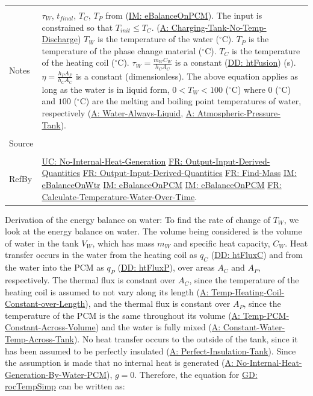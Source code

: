 \documentclass[12pt]{article}
\begin{document}
\begin{minipage}{\textwidth}
\begin{tabular}{p{} p{}}
\\ \midrule \\
Notes & ${τ_{W}}$, ${t_{final}}$, ${T_{C}}$, ${T_{P}}$ from (\hyperref[IM:eBalanceOnPCM]{IM: eBalanceOnPCM}). The input is constrained so that ${T_{init}}\leq{}{T_{C}}$. (\hyperref[assumpCTNOD]{A: Charging-Tank-No-Temp-Discharge}) ${T_{W}}$ is the temperature of the water (${}^{\circ}$C). ${T_{P}}$ is the temperature of the phase change material (${}^{\circ}$C). ${T_{C}}$ is the temperature of the heating coil (${}^{\circ}$C). ${τ_{W}}=\frac{{m_{W}} {C_{W}}}{{h_{C}} {A_{C}}}$ is a constant (\hyperref[DD:htFusion]{DD: htFusion}) (s). $η=\frac{{h_{P}} {A_{P}}}{{h_{C}} {A_{C}}}$ is a constant (dimensionless). The above equation applies as long as the water is in liquid form, $0<{T_{W}}<100$ (${}^{\circ}$C) where $0$ (${}^{\circ}$C) and $100$ (${}^{\circ}$C) are the melting and boiling point temperatures of water, respectively (\hyperref[assumpWAL]{A: Water-Always-Liquid}, \hyperref[assumpAPT]{A: Atmospheric-Pressure-Tank}).
\\ \midrule \\
Source & \cite{koothoor2013}
\\ \midrule \\
RefBy & \hyperref[unlikeChgNIHG]{UC: No-Internal-Heat-Generation} \hyperref[outputInputDerivQuants]{FR: Output-Input-Derived-Quantities} \hyperref[outputInputDerivQuants]{FR: Output-Input-Derived-Quantities} \hyperref[findMass]{FR: Find-Mass} \hyperref[IM:eBalanceOnWtr]{IM: eBalanceOnWtr} \hyperref[IM:eBalanceOnPCM]{IM: eBalanceOnPCM} \hyperref[IM:eBalanceOnPCM]{IM: eBalanceOnPCM} \hyperref[calcTempWtrOverTime]{FR: Calculate-Temperature-Water-Over-Time}.
\\ \bottomrule \end{tabular}
\end{minipage}
Derivation of the energy balance on water:
To find the rate of change of ${T_{W}}$, we look at the energy balance on water. The volume being considered is the volume of water in the tank ${V_{W}}$, which has mass ${m_{W}}$ and specific heat capacity, ${C_{W}}$. Heat transfer occurs in the water from the heating coil as ${q_{C}}$ (\hyperref[DD:htFluxC]{DD: htFluxC})  and from the water into the PCM as ${q_{P}}$ (\hyperref[DD:htFluxP]{DD: htFluxP}), over areas ${A_{C}}$ and ${A_{P}}$, respectively. The thermal flux is constant over ${A_{C}}$, since the temperature of the heating coil is assumed to not vary along its length (\hyperref[assumpTHCCoL]{A: Temp-Heating-Coil-Constant-over-Length}), and the thermal flux is constant over ${A_{P}}$, since the temperature of the PCM is the same throughout its volume (\hyperref[assumpTPCAV]{A: Temp-PCM-Constant-Across-Volume}) and the water is fully mixed (\hyperref[assumpCWTAT]{A: Constant-Water-Temp-Across-Tank}). No heat transfer occurs to the outside of the tank, since it has been assumed to be perfectly insulated (\hyperref[assumpPIT]{A: Perfect-Insulation-Tank}). Since the assumption is made that no internal heat is generated (\hyperref[assumpNIHGBWP]{A: No-Internal-Heat-Generation-By-Water-PCM}), $g=0$. Therefore, the equation for \hyperref[GD:rocTempSimp]{GD: rocTempSimp} can be written as:
\end{document}
